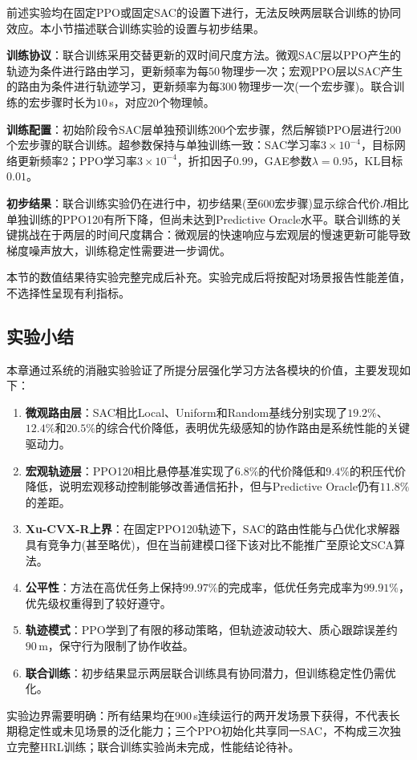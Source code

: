 前述实验均在固定PPO或固定SAC的设置下进行，无法反映两层联合训练的协同效应。本小节描述联合训练实验的设置与初步结果。

\textbf{训练协议}：联合训练采用交替更新的双时间尺度方法。微观SAC层以PPO产生的轨迹为条件进行路由学习，更新频率为每$50\,$物理步一次；宏观PPO层以SAC产生的路由为条件进行轨迹学习，更新频率为每$300\,$物理步一次(一个宏步骤)。联合训练的宏步骤时长为$10\,$s，对应$20$个物理帧。

\textbf{训练配置}：初始阶段令SAC层单独预训练$200$个宏步骤，然后解锁PPO层进行$200$个宏步骤的联合训练。超参数保持与单独训练一致：SAC学习率$3\times10^{-4}$，目标网络更新频率$2$；PPO学习率$3\times10^{-4}$，折扣因子$0.99$，GAE参数$\lambda=0.95$，KL目标$0.01$。

\textbf{初步结果}：联合训练实验仍在进行中，初步结果(至$600$宏步骤)显示综合代价$J$相比单独训练的PPO120有所下降，但尚未达到Predictive Oracle水平。联合训练的关键挑战在于两层的时间尺度耦合：微观层的快速响应与宏观层的慢速更新可能导致梯度噪声放大，训练稳定性需要进一步调优。

本节的数值结果待实验完整完成后补充。实验完成后将按配对场景报告性能差值，不选择性呈现有利指标。

\subsection{实验小结}
\label{ssec:experiment_summary}

本章通过系统的消融实验验证了所提分层强化学习方法各模块的价值，主要发现如下：

\begin{enumerate}
\item \textbf{微观路由层}：SAC相比Local、Uniform和Random基线分别实现了$19.2\%$、$12.4\%$和$20.5\%$的综合代价降低，表明优先级感知的协作路由是系统性能的关键驱动力。

\item \textbf{宏观轨迹层}：PPO120相比悬停基准实现了$6.8\%$的代价降低和$9.4\%$的积压代价降低，说明宏观移动控制能够改善通信拓扑，但与Predictive Oracle仍有$11.8\%$的差距。

\item \textbf{Xu-CVX-R上界}：在固定PPO120轨迹下，SAC的路由性能与凸优化求解器具有竞争力(甚至略优)，但在当前建模口径下该对比不能推广至原论文SCA算法。

\item \textbf{公平性}：方法在高优任务上保持$99.97\%$的完成率，低优任务完成率为$99.91\%$，优先级权重得到了较好遵守。

\item \textbf{轨迹模式}：PPO学到了有限的移动策略，但轨迹波动较大、质心跟踪误差约$90\,$m，保守行为限制了协作收益。

\item \textbf{联合训练}：初步结果显示两层联合训练具有协同潜力，但训练稳定性仍需优化。
\end{enumerate}

实验边界需要明确：所有结果均在$900\,$s连续运行的两开发场景下获得，不代表长期稳定性或未见场景的泛化能力；三个PPO初始化共享同一SAC，不构成三次独立完整HRL训练；联合训练实验尚未完成，性能结论待补。
